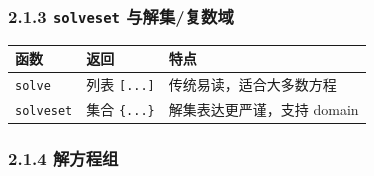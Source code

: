 \subsubsection{\texorpdfstring{2.1.3 \texttt{solveset}
与解集/复数域}{2.1.3 solveset 与解集/复数域}}\label{solveset-ux4e0eux89e3ux96c6ux590dux6570ux57df}

\begin{Shaded}
\begin{Highlighting}[]
\OperatorTok{=}\NormalTok{)}
\OperatorTok{**} \OperatorTok{{-}} \OperatorTok{*}\OperatorTok{+} 
\OperatorTok{*}\OperatorTok{**} \OperatorTok{+} \OperatorTok{*}\OperatorTok{+} 
\OperatorTok{**} \OperatorTok{+} \OperatorTok{=}
\end{Highlighting}
\end{Shaded}

\begin{Shaded}
\begin{Highlighting}[]
\end{Highlighting}
\end{Shaded}

{\def\LTcaptype{none} %
\begin{longtable}[]{@{}lll@{}}
\toprule\noalign{}
函数 & 返回 & 特点 \\
\midrule\noalign{}
\endhead
\bottomrule\noalign{}
\endlastfoot
\texttt{solve} & 列表 \texttt{{[}...{]}} & 传统易读，适合大多数方程 \\
\texttt{solveset} & 集合 \texttt{\{...\}} & 解集表达更严谨，支持
domain \\
\end{longtable}
}

\subsubsection{2.1.4 解方程组}\label{ux89e3ux65b9ux7a0bux7ec4}

